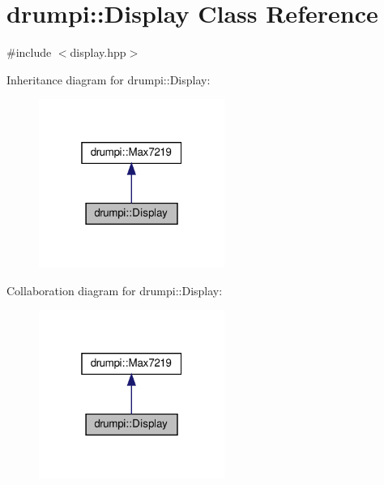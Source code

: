 \hypertarget{classdrumpi_1_1Display}{}\section{drumpi\+:\+:Display Class Reference}
\label{classdrumpi_1_1Display}


{\ttfamily \#include $<$display.\+hpp$>$}



Inheritance diagram for drumpi\+:\+:Display\+:
\nopagebreak
\begin{figure}[H]
\begin{center}
\leavevmode
\includegraphics[width=172pt]{classdrumpi_1_1Display__inherit__graph}
\end{center}
\end{figure}


Collaboration diagram for drumpi\+:\+:Display\+:
\nopagebreak
\begin{figure}[H]
\begin{center}
\leavevmode
\includegraphics[width=172pt]{classdrumpi_1_1Display__coll__graph}
\end{center}
\end{figure}
